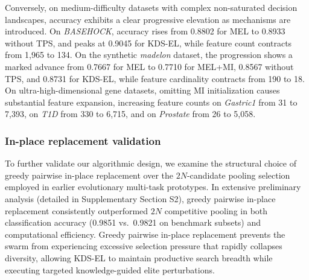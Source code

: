 Conversely, on medium-difficulty datasets with complex non-saturated decision landscapes, accuracy exhibits a clear progressive elevation as mechanisms are introduced. On \textit{BASEHOCK}, accuracy rises from 0.8802 for MEL to 0.8933 without TPS, and peaks at 0.9045 for KDS-EL, while feature count contracts from 1{,}965 to 134. On the synthetic \textit{madelon} dataset, the progression shows a marked advance from 0.7667 for MEL to 0.7710 for MEL+MI, 0.8567 without TPS, and 0.8731 for KDS-EL, while feature cardinality contracts from 190 to 18. On ultra-high-dimensional gene datasets, omitting MI initialization causes substantial feature expansion, increasing feature counts on \textit{Gastric1} from 31 to 7{,}393, on \textit{T1D} from 330 to 6{,}715, and on \textit{Prostate} from 26 to 5{,}058.

\subsubsection{In-place replacement validation}

To further validate our algorithmic design, we examine the structural choice of greedy pairwise in-place replacement over the $2N$-candidate pooling selection employed in earlier evolutionary multi-task prototypes. In extensive preliminary analysis (detailed in Supplementary Section S2), greedy pairwise in-place replacement consistently outperformed $2N$ competitive pooling in both classification accuracy (0.9851 vs.\ 0.9821 on benchmark subsets) and computational efficiency. Greedy pairwise in-place replacement prevents the swarm from experiencing excessive selection pressure that rapidly collapses diversity, allowing KDS-EL to maintain productive search breadth while executing targeted knowledge-guided elite perturbations.
